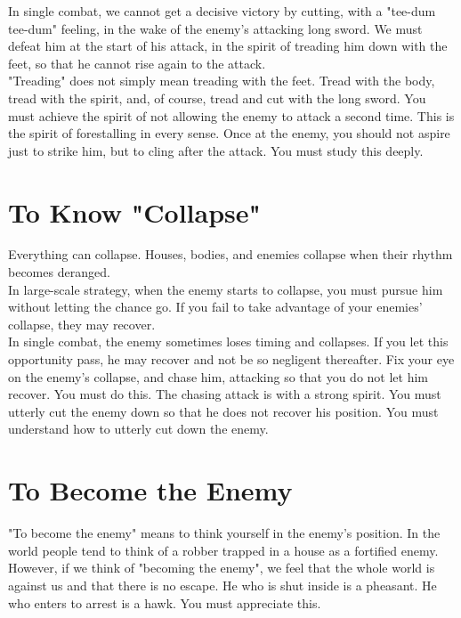 In single combat, we cannot get a decisive victory by cutting, with a "tee-dum tee-dum" feeling, in the wake of the enemy's attacking long sword. We must defeat him at the start of his attack, in the spirit of treading him down with the feet, so that he cannot rise again to the attack.\\

"Treading" does not simply mean treading with the feet. Tread with the body, tread with the spirit, and, of course, tread and cut with the long sword. You must achieve the spirit of not allowing the enemy to attack a second time. This is the spirit of forestalling in every sense. Once at the enemy, you should not aspire just to strike him, but to cling after the attack. You must study this deeply.\\
\section{To Know "Collapse"}

Everything can collapse. Houses, bodies, and enemies collapse when their rhythm becomes deranged.\\

In large-scale strategy, when the enemy starts to collapse, you must pursue him without letting the chance go. If you fail to take advantage of your enemies' collapse, they may recover.\\

In single combat, the enemy sometimes loses timing and collapses. If you let this opportunity pass, he may recover and not be so negligent thereafter. Fix your eye on the enemy's collapse, and chase him, attacking so that you do not let him recover. You must do this. The chasing attack is with a strong spirit. You must utterly cut the enemy down so that he does not recover his position. You must understand how to utterly cut down the enemy.\\
\section{To Become the Enemy}

"To become the enemy" means to think yourself in the enemy's position. In the world people tend to think of a robber trapped in a house as a fortified enemy. However, if we think of "becoming the enemy", we feel that the whole world is against us and that there is no escape. He who is shut inside is a pheasant. He who enters to arrest is a hawk. You must appreciate this.\\

